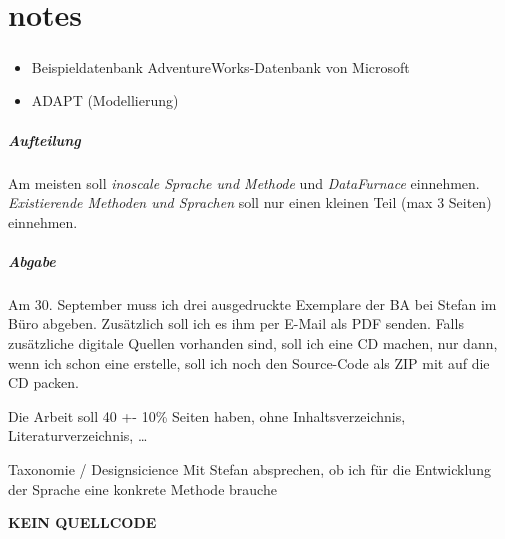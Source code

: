 \chapter{notes}
\paragraph{}
\begin{itemize}
  \item Beispieldatenbank AdventureWorks-Datenbank von Microsoft
  \item ADAPT (Modellierung)
\end{itemize}

\paragraph{Aufteilung}
Am meisten soll \textit{inoscale Sprache und Methode} und \textit{DataFurnace} einnehmen. \textit{Existierende Methoden und Sprachen} soll nur einen kleinen Teil (max 3 Seiten) einnehmen.

\paragraph{Abgabe}
Am 30. September muss ich drei ausgedruckte Exemplare der BA bei Stefan im Büro
abgeben. Zusätzlich soll ich es ihm per E-Mail als PDF senden. Falls
zusätzliche digitale Quellen vorhanden sind, soll ich eine CD machen, nur dann,
wenn ich schon eine erstelle, soll ich noch den Source-Code als ZIP mit auf die
CD packen.

Die Arbeit soll 40 +- 10\% Seiten haben, ohne Inhaltsverzeichnis, Literaturverzeichnis, \ldots


Taxonomie / Designsicience 
Mit Stefan absprechen, ob ich für die Entwicklung der Sprache eine konkrete
Methode brauche

\textbf{KEIN QUELLCODE}
